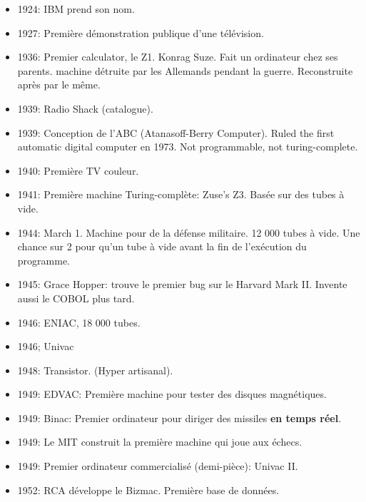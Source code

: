 \documentclass[a4paper,11pt]{article}
\begin{document}
\begin{itemize}
\item 1924: IBM prend son nom.

\item 1927: Première démonstration publique d'une télévision.

\item 1936: Premier calculator, le Z1. Konrag Suze. Fait un ordinateur chez
  ses parents. machine détruite par les Allemands pendant la guerre.
  Reconstruite après par le même.

\item 1939: Radio Shack (catalogue).

\item 1939: Conception de l'ABC (Atanasoff-Berry Computer). Ruled the first automatic
  digital computer en 1973. Not programmable, not turing-complete.

\item 1940: Première TV couleur.

\item 1941: Première machine Turing-complète: Zuse's Z3. Basée sur des tubes à
  vide.

\item 1944: March 1. Machine pour de la défense militaire. 12 000 tubes à vide.
  Une chance sur 2 pour qu'un tube à vide avant la fin de l'exécution du
  programme.

\item 1945: Grace Hopper: trouve le premier bug sur le Harvard Mark II.
  Invente aussi le COBOL plus tard.

\item 1946: ENIAC, 18 000 tubes.

\item 1946; Univac

\item 1948: Transistor. (Hyper artisanal).

\item 1949: EDVAC: Première machine pour tester des disques magnétiques.

\item 1949: Binac: Premier ordinateur pour diriger des missiles \textbf{en temps
    réel}.

\item 1949: Le MIT construit la première machine qui joue aux échecs.

\item 1949: Premier ordinateur commercialisé (demi-pièce): Univac II.

\item 1952: RCA développe le Bizmac. Première base de données.


\end{itemize}
\end{document}
